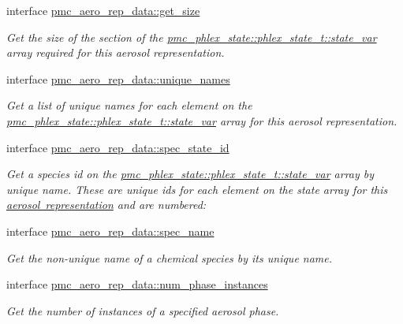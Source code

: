 \begin{DoxyCompactItemize}
interface \mbox{\hyperlink{interfacepmc__aero__rep__data_1_1get__size}{pmc\+\_\+aero\+\_\+rep\+\_\+data\+::get\+\_\+size}}
\begin{DoxyCompactList}\small\item\em Get the size of the section of the {\ttfamily \mbox{\hyperlink{structpmc__phlex__state_1_1phlex__state__t_a78835cb552d483ebbfc7a6bc6f756918}{pmc\+\_\+phlex\+\_\+state\+::phlex\+\_\+state\+\_\+t\+::state\+\_\+var}}} array required for this aerosol representation. \end{DoxyCompactList}\item 
interface \mbox{\hyperlink{interfacepmc__aero__rep__data_1_1unique__names}{pmc\+\_\+aero\+\_\+rep\+\_\+data\+::unique\+\_\+names}}
\begin{DoxyCompactList}\small\item\em Get a list of unique names for each element on the {\ttfamily \mbox{\hyperlink{structpmc__phlex__state_1_1phlex__state__t_a78835cb552d483ebbfc7a6bc6f756918}{pmc\+\_\+phlex\+\_\+state\+::phlex\+\_\+state\+\_\+t\+::state\+\_\+var}}} array for this aerosol representation. \end{DoxyCompactList}\item 
interface \mbox{\hyperlink{interfacepmc__aero__rep__data_1_1spec__state__id}{pmc\+\_\+aero\+\_\+rep\+\_\+data\+::spec\+\_\+state\+\_\+id}}
\begin{DoxyCompactList}\small\item\em Get a species id on the {\ttfamily \mbox{\hyperlink{structpmc__phlex__state_1_1phlex__state__t_a78835cb552d483ebbfc7a6bc6f756918}{pmc\+\_\+phlex\+\_\+state\+::phlex\+\_\+state\+\_\+t\+::state\+\_\+var}}} array by unique name. These are unique ids for each element on the state array for this \mbox{\hyperlink{phlex_aero_rep}{aerosol representation}} and are numbered\+: \end{DoxyCompactList}\item 
interface \mbox{\hyperlink{interfacepmc__aero__rep__data_1_1spec__name}{pmc\+\_\+aero\+\_\+rep\+\_\+data\+::spec\+\_\+name}}
\begin{DoxyCompactList}\small\item\em Get the non-\/unique name of a chemical species by its unique name. \end{DoxyCompactList}\item 
interface \mbox{\hyperlink{interfacepmc__aero__rep__data_1_1num__phase__instances}{pmc\+\_\+aero\+\_\+rep\+\_\+data\+::num\+\_\+phase\+\_\+instances}}
\begin{DoxyCompactList}\small\item\em Get the number of instances of a specified aerosol phase. \end{DoxyCompactList}\end{DoxyCompactItemize}
